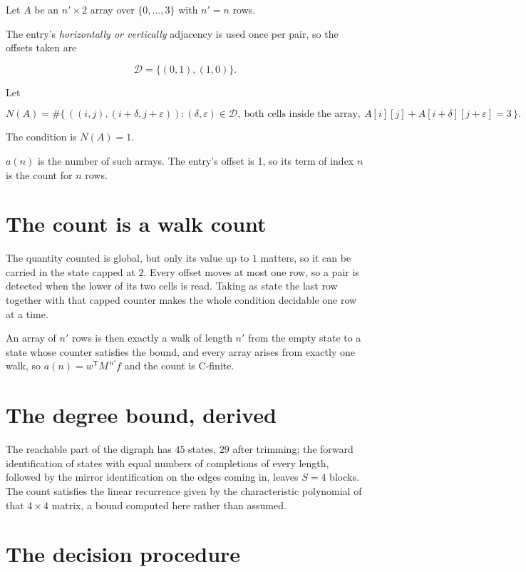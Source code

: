 \documentclass[11pt]{article}
\theoremstyle{definition}
\begin{document}
Let $A$ be an $n' \times 2$ array over $\{0,\dots,3\}$ with $n' = n$ rows.

The entry's {\itshape horizontally or vertically} adjacency is used once per pair, so the offsets taken are

\[\mathcal{D} = \{(0,1), (1,0)\}.\]

Let

\[N(A) = \#\bigl\{\,((i,j),(i{+}\delta,j{+}\varepsilon)) : (\delta,\varepsilon) \in \mathcal{D},\ \text{both cells inside the array},\ A[i][j] + A[i{+}\delta][j{+}\varepsilon] = 3\,\bigr\}.\]

The condition is $N(A) = 1$.

$a(n)$ is the number of such arrays. The entry's offset is 1, so its term of index $n$ is the count for $n$ rows.

\section{The count is a walk count}

The quantity counted is global, but only its value up to $1$ matters, so it can be carried in the state capped at $2$. Every offset moves at most one row, so a pair is detected when the lower of its two cells is read. Taking as state the last row together with that capped counter makes the whole condition decidable one row at a time.

An array of $n'$ rows is then exactly a walk of length $n'$ from the empty state to a state whose counter satisfies the bound, and every array arises from exactly one walk, so $a(n) = w^{\mathsf T}M^{\,n'}f$ and the count is C-finite.

\section{The degree bound, derived}

The reachable part of the digraph has $45$ states, $29$ after trimming; the forward identification of states with equal numbers of completions of every length, followed by the mirror identification on the edges coming in, leaves $S = 4$ blocks. The count satisfies the linear recurrence given by the characteristic polynomial of that $4\times4$ matrix, a bound computed here rather than assumed.

\section{The decision procedure}
\end{document}
